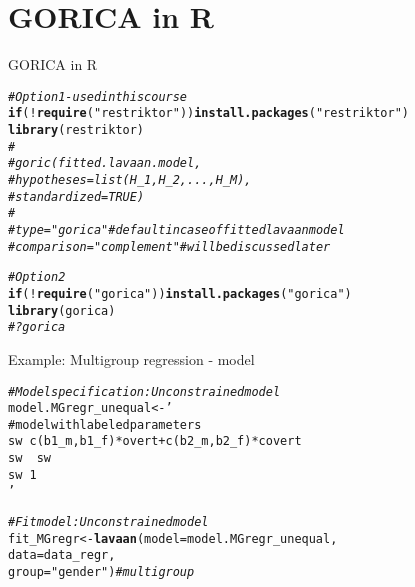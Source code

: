 \documentclass[10pt]{beamer}\usepackage[]{graphicx}\usepackage[]{xcolor}
\makeatletter
\newcommand{\hlsng}[1]{\textcolor[rgb]{0.192,0.494,0.8}{#1}}%
\newcommand{\hlcom}[1]{\textcolor[rgb]{0.678,0.584,0.686}{\textit{#1}}}%
\newcommand{\hlopt}[1]{\textcolor[rgb]{0,0,0}{#1}}%
\newcommand{\hldef}[1]{\textcolor[rgb]{0.345,0.345,0.345}{#1}}%
\newcommand{\hlkwa}[1]{\textcolor[rgb]{0.161,0.373,0.58}{\textbf{#1}}}%
\newcommand{\hlkwb}[1]{\textcolor[rgb]{0.69,0.353,0.396}{#1}}%
\newcommand{\hlkwc}[1]{\textcolor[rgb]{0.333,0.667,0.333}{#1}}%
\newcommand{\hlkwd}[1]{\textcolor[rgb]{0.737,0.353,0.396}{\textbf{#1}}}%
\newenvironment{kframe}{%
 \def\at@end@of@kframe{}%
 \ifinner\ifhmode%
  \def\at@end@of@kframe{\end{minipage}}%
  \begin{minipage}{\columnwidth}%
 \fi\fi%
 \def\FrameCommand##1{\hskip\@totalleftmargin \hskip-\fboxsep
 \colorbox{shadecolor}{##1}\hskip-\fboxsep
     \hskip-\linewidth \hskip-\@totalleftmargin \hskip\columnwidth}%
 \MakeFramed {\advance\hsize-\width
   \@totalleftmargin\z@ \linewidth\hsize
   \@setminipage}}%
 {\par\unskip\endMakeFramed%
 \at@end@of@kframe}
\newenvironment{knitrout}{}{} %
\makeatother
\begin{document}
\section{GORICA in R}
%
%
\begin{frame}[fragile]{GORICA in R}

\begin{knitrout}
\color{fgcolor}\begin{kframe}
\begin{alltt}
\hlcom{# Option 1 - used in this course}
\hlkwa{if} \hldef{(}\hlopt{!}\hlkwd{require}\hldef{(}\hlsng{"restriktor"}\hldef{))} \hlkwd{install.packages}\hldef{(}\hlsng{"restriktor"}\hldef{)}
\hlkwd{library}\hldef{(restriktor)}
\hlcom{#}
\hlcom{#goric(fitted.lavaan.model, }
\hlcom{#      hypotheses = list(H_1, H_2, ..., H_M),}
\hlcom{#      standardized = TRUE)}
\hlcom{#}
\hlcom{#type = "gorica" # default in case of fitted lavaan model}
\hlcom{#comparison = "complement" # will be discussed later}

\hlcom{# Option 2}
\hlkwa{if} \hldef{(}\hlopt{!}\hlkwd{require}\hldef{(}\hlsng{"gorica"}\hldef{))} \hlkwd{install.packages}\hldef{(}\hlsng{"gorica"}\hldef{)}
\hlkwd{library}\hldef{(gorica)}
\hlcom{#?gorica}
\end{alltt}
\end{kframe}
\end{knitrout}
          
\end{frame}
%
\begin{frame}[fragile]{Example: Multigroup regression - model}

\begin{knitrout}
\color{fgcolor}\begin{kframe}
\begin{alltt}
\hlcom{# Model specification: Unconstrained model}
\hldef{model.MGregr_unequal} \hlkwb{<-} \hlsng{'
  # model with labeled parameters
  sw ~ c(b1_m,b1_f)*overt + c(b2_m,b2_f)*covert 
  sw ~~ sw                                      
  sw ~ 1                                        
'}

\hlcom{# Fit model: Unconstrained model}
\hldef{fit_MGregr} \hlkwb{<-} \hlkwd{lavaan}\hldef{(}\hlkwc{model} \hldef{= model.MGregr_unequal,}
                    \hlkwc{data} \hldef{= data_regr,}
                    \hlkwc{group} \hldef{=} \hlsng{"gender"}\hldef{)} \hlcom{# multigroup}
\end{alltt}
\end{kframe}
\end{knitrout}
          
\end{frame}
\end{document}

